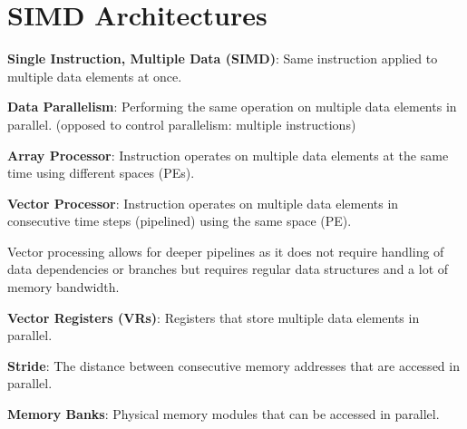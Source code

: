 \section{SIMD Architectures}

\begin{definition}
    \textbf{Single Instruction, Multiple Data (SIMD)}: Same instruction applied to multiple data elements at once.
\end{definition}

\begin{definition}
    \textbf{Data Parallelism}: Performing the same operation on multiple data elements in parallel. (opposed to control parallelism: multiple instructions)
\end{definition}

\begin{definition}
    \textbf{Array Processor}: Instruction operates on multiple data elements at the same time using different spaces (PEs).
\end{definition}

\begin{definition}
    \textbf{Vector Processor}: Instruction operates on multiple data elements in consecutive time steps (pipelined) using the same space (PE).
\end{definition}

\begin{remark}
    Vector processing allows for deeper pipelines as it does not require handling of data dependencies or branches but requires regular data structures and a lot of memory bandwidth.
\end{remark}

\begin{definition}
    \textbf{Vector Registers (VRs)}: Registers that store multiple data elements in parallel.
\end{definition}

\begin{definition}
    \textbf{Stride}: The distance between consecutive memory addresses that are accessed in parallel.
\end{definition}

\begin{definition}
    \textbf{Memory Banks}: Physical memory modules that can be accessed in parallel.
\end{definition}